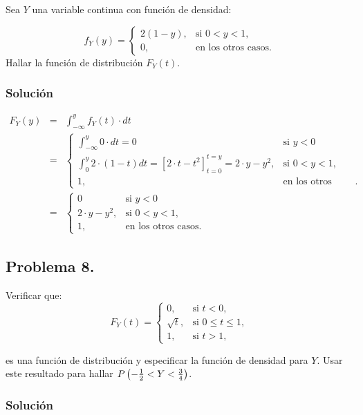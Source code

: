 \documentclass[
]{article}
\begin{document}
Sea \(Y\) una variable continua con función de densidad:

\[
f_Y(y)=
\left\{\begin{array}{ll}
2(1-y), & \mbox{si $0<y<1$},\\ 0, & \mbox{en los otros casos}.
\end{array}\right.
\] Hallar la función de distribución \(F_Y(t)\).

\subsubsection{Solución}\label{soluciuxf3n-6}

\begin{eqnarray*}
F_Y(y)&=&\int_{-\infty}^y f_Y(t)\cdot  dt\\ &=&
\left\{
\begin{array}{ll}
\int_{-\infty}^y 0\cdot dt=0 & \mbox{si } y<0\\
\int_{0}^y 2\cdot (1-t)dt= \left[2\cdot t- t^2\right]_{t=0}^{t=y}=
2\cdot y-y^2, & \mbox{si } 0<y<1,\\ 
1, & \mbox{en los otros casos}.
\end{array}\right.\\
&=&
\left\{
\begin{array}{ll}
0 & \mbox{si } y<0\\
2\cdot y-y^2, & \mbox{si } 0<y<1,\\ 
1, & \mbox{en los otros casos}.
\end{array}\right.
\end{eqnarray*}

\subsection{Problema 8.}\label{problema-8.}

Verificar que: \[
F_Y(t)=
\left\{\begin{array}{ll}
0, & \mbox{si $t<0$},\\
\sqrt{t}, & \mbox{si $0\leq t\leq 1$},\\ 1, &
\mbox{si $t>1$},
\end{array}\right.
\]

es una función de distribución y especificar la función de densidad para
\(Y\). Usar este resultado para hallar
\(P\left(-{1\over 2}<Y<{3\over 4}\right)\).

\subsubsection{Solución}\label{soluciuxf3n-7}
\end{document}
